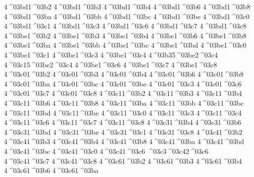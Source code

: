 {4^^^^03bd1^^^^03b2
4^^^^03bd1^^^^03b3
4^^^^03bd1^^^^03b4
4^^^^03bd1^^^^03b6
4^^^^03bd1^^^^03b8
4^^^^03bd1^^^^03ba
4^^^^03bd1^^^^03bb
4^^^^03bd1^^^^03bc
4^^^^03bd1^^^^03be
4^^^^03bd1^^^^03c0
4^^^^03bd1^^^^03c1
4^^^^03bd1^^^^03c3
4^^^^03bd1^^^^03c6
4^^^^03bd1^^^^03c7
4^^^^03bd1^^^^03c8
4^^^^03be1^^^^03b2
4^^^^03be1^^^^03b3
4^^^^03be1^^^^03b4
4^^^^03be1^^^^03b6
4^^^^03be1^^^^03b8
4^^^^03be1^^^^03ba
4^^^^03be1^^^^03bb
4^^^^03be1^^^^03bc
4^^^^03be1^^^^03bd
4^^^^03be1^^^^03c0
4^^^^03be1^^^^03c1
4^^^^03be1^^^^03c3
4^^^^03be1^^^^03c4
4^^^^03b35^^^^03be2^^^^03c4 %
4^^^^03c15^^^^03be2^^^^03c4 %
4^^^^03be1^^^^03c6
4^^^^03be1^^^^03c7
4^^^^03be1^^^^03c8
4^^^^03c01^^^^03b2
4^^^^03c01^^^^03b3
4^^^^03c01^^^^03b4
4^^^^03c01^^^^03b6
4^^^^03c01^^^^03b8
4^^^^03c01^^^^03ba
4^^^^03c01^^^^03bc
4^^^^03c01^^^^03be
4^^^^03c01^^^^03c3
4^^^^03c01^^^^03c6
4^^^^03c01^^^^03c7
4^^^^03c01^^^^03c8
4^^^^03c11^^^^03b2
4^^^^03c11^^^^03b3
4^^^^03c11^^^^03b4
4^^^^03c11^^^^03b6
4^^^^03c11^^^^03b8
4^^^^03c11^^^^03ba
4^^^^03c11^^^^03bb
4^^^^03c11^^^^03bc
4^^^^03c11^^^^03bd
4^^^^03c11^^^^03be
4^^^^03c11^^^^03c0
4^^^^03c11^^^^03c3
4^^^^03c11^^^^03c4
4^^^^03c11^^^^03c6
4^^^^03c11^^^^03c7
4^^^^03c11^^^^03c8
4^^^^03c31^^^^03b4 %
4^^^^03c31^^^^03b6 
4^^^^03c31^^^^03bd %
4^^^^03c31^^^^03be
4^^^^03c31^^^^03c1
4^^^^03c31^^^^03c8
4^^^^03c41^^^^03b2
4^^^^03c41^^^^03b3
4^^^^03c41^^^^03b4
4^^^^03c41^^^^03b8
4^^^^03c41^^^^03ba 
4^^^^03c41^^^^03bd
4^^^^03c41^^^^03be
4^^^^03c41^^^^03c0
4^^^^03c41^^^^03c6
^^^^03c3^^^^03c42^^^^03c6 %
4^^^^03c41^^^^03c7
4^^^^03c41^^^^03c8
4^^^^03c61^^^^03b2
4^^^^03c61^^^^03b3
4^^^^03c61^^^^03b4
4^^^^03c61^^^^03b6 
4^^^^03c61^^^^03ba %
}
